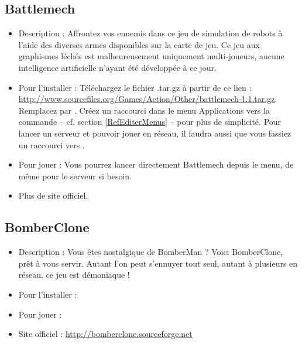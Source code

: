 \subsection{Battlemech}
\begin{itemize}
\begingroup
{}
\item Description : Affrontez vos ennemis dans ce jeu de simulation de robots à l'aide des diverses armes disponibles sur la carte de jeu. Ce jeu aux graphismes léchés est malheureusement uniquement multi-joueurs, aucune intelligence artificielle n'ayant été développée à ce jour.{\par}
\endgroup
\item Pour l'installer : Téléchargez le fichier .tar.gz à partir de ce lien : \url{http://www.sourcefiles.org/Games/Action/Other/battlemech-1.1.tar.gz}. Remplacez  par . Créez un raccourci dans le menu Applications vers la commande  -- cf. section \ref{RefEditerMenus} -- pour plus de simplicité. Pour lancer un serveur et pouvoir jouer en réseau, il faudra aussi que vous fassiez un raccourci vers .{\par}
\item Pour jouer : Vous pourrez lancer directement Battlemech depuis le menu, de même pour le serveur si besoin.{\par}
\item Plus de site officiel.{\par}
\end{itemize}
\newpage
\subsection{BomberClone}
\begin{itemize}
\begingroup
{}
\item Description : Vous êtes nostalgique de BomberMan ? Voici BomberClone, prêt à vous servir. Autant l'on peut s'ennuyer tout seul, autant à plusieurs en réseau, ce jeu est démoniaque !{\par}
\item Pour l'installer : 
\item Pour jouer : 
\item Site officiel : \url{http://bomberclone.sourceforge.net}{\par}
\endgroup
\end{itemize}
